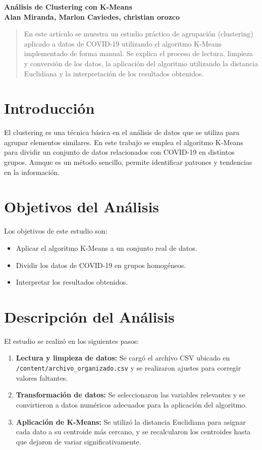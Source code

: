 \documentclass[a4paper, 10pt]{article}
\begin{document}
\begin{center}
\LARGE
\textbf{Análisis de Clustering con K-Means}{}\\[6pt]
\small
\textbf {Alan Miranda, Marlon Caviedes, christian orozco}\\[6pt]
\end{center}

\begin{abstract}
En este artículo se muestra un estudio práctico de agrupación (clustering) aplicado a datos de COVID-19 utilizando el algoritmo K-Means implementado de forma manual. Se explica el proceso de lectura, limpieza y conversión de los datos, la aplicación del algoritmo utilizando la distancia Euclidiana y la interpretación de los resultados obtenidos.\\
\end{abstract}

\section{Introducción}
El clustering es una técnica básica en el análisis de datos que se utiliza para agrupar elementos similares. En este trabajo se emplea el algoritmo K-Means para dividir un conjunto de datos relacionados con COVID-19 en distintos grupos. Aunque es un método sencillo, permite identificar patrones y tendencias en la información.

\section{Objetivos del Análisis}
Los objetivos de este estudio son:
\begin{itemize}
    \item Aplicar el algoritmo K-Means a un conjunto real de datos.
    \item Dividir los datos de COVID-19 en grupos homogéneos.
    \item Interpretar los resultados obtenidos.
\end{itemize}

\section{Descripción del Análisis}
El estudio se realizó en los siguientes pasos:
\begin{enumerate}
    \item \textbf{Lectura y limpieza de datos:} Se cargó el archivo CSV ubicado en \texttt{/content/archivo\_organizado.csv} y se realizaron ajustes para corregir valores faltantes.
    \item \textbf{Transformación de datos:} Se seleccionaron las variables relevantes y se convirtieron a datos numéricos adecuados para la aplicación del algoritmo.
    \item \textbf{Aplicación de K-Means:} Se utilizó la distancia Euclidiana para asignar cada dato a su centroide más cercano, y se recalcularon los centroides hasta que dejaron de variar significativamente.
\end{enumerate}
\end{document}
